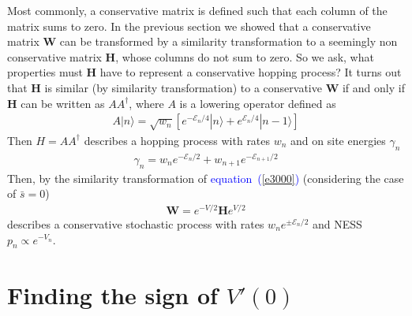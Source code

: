 \documentclass[aps,pre,floats,floatfix,twocolumn]{revtex4}
\newcommand{\beq}{\begin{eqnarray}}
\newcommand{\eeq}{\end{eqnarray}}
\newcommand{\Eq}[1]{\textcolor{blue}{{equation}\!~(\ref{#1})}}
\begin{document}
Most commonly, a conservative matrix is defined such that each column of the matrix sums to zero. 
In the previous section we showed that a conservative matrix ${\bm W}$ can be transformed 
by a similarity transformation to a seemingly non conservative matrix ${\bm H}$, whose columns do not sum to zero. 
So we ask, what properties must ${\bm H}$ have to represent a conservative hopping process?
It turns out that ${\bm H}$ is similar (by similarity transformation) to a conservative ${\bm W}$ if and only if 
${\bm H}$ can be written as $AA^{\dag}$, where $A$ is a lowering operator defined as 
%
\beq
A |n\rangle = \sqrt{w_n} \left[ e^{-\mathcal{E}_n/4} |n \rangle + e^{\mathcal{E}_n/4} |n-1 \rangle \right]
\eeq
%
Then $H=AA^{\dag}$ describes a hopping process with rates $w_n$ 
and on site energies $\gamma_n$
%
\beq
\gamma_n =w_n e^{-\mathcal{E}_n/2}+w_{n+1} e^{-\mathcal{E}_{n+1}/2}
\eeq
%
Then, by the similarity transformation of \Eq{e3000} (considering the case of $\bar{s}=0$)
%
\beq
{\bm W} = e^{-V/2} {\bm H} e^{V/2}
\eeq
%
describes a conservative stochastic process with rates $w_n e^{\pm \mathcal{E}_n/2}$ and NESS $p_n \propto e^{-V_n}$.




\section{Finding the sign of $V'(0)$}
\label{A1}
\end{document}

